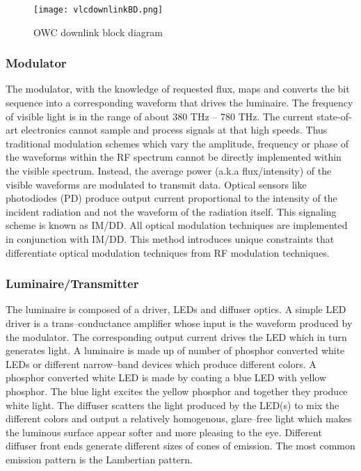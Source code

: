 \begin{figure}[!t]
	\centering
		\texttt{[image: vlcdownlinkBD.png]}
	\caption{OWC downlink block diagram}
	\label{fig:VLCdownBD}
\end{figure}

\subsubsection{Modulator}
\label{subsubsec:outlineModulator}
The modulator, with the knowledge of requested flux, maps and converts the bit sequence into a corresponding waveform that drives the luminaire. The frequency of visible light is in the range of about 380 THz -- 780 THz. The current state-of-art electronics cannot sample and process signals at that high speeds. Thus traditional modulation schemes which vary the amplitude, frequency or phase of the waveforms within the RF spectrum cannot be directly implemented within the visible spectrum. Instead, the average power (a.k.a flux/intensity) of the visible waveforms are modulated to transmit data. Optical sensors like photodiodes (PD) produce output current proportional to the intensity of the incident radiation and not the waveform of the radiation itself. This signaling scheme is known as IM/DD. All optical modulation techniques are implemented in conjunction with IM/DD. This method introduces unique constraints that differentiate optical modulation techniques from RF modulation techniques.

\subsubsection{Luminaire/Transmitter}
\label{subsubsec:outlineLuminaire}
The luminaire is composed of a driver, LEDs and diffuser optics. A simple LED driver is a trans--conductance amplifier whose input is the waveform produced by the modulator. The corresponding output current drives the LED which in turn generates light. A luminaire is made up of number of phosphor converted white LEDs or different narrow--band devices which produce different colors. A phosphor converted white LED is made by coating a blue LED with yellow phosphor. The blue light excites the yellow phosphor and together they produce white light. The diffuser scatters the light produced by the LED(s) to mix the different colors and output a relatively homogenous, glare--free light which makes the luminous surface appear softer and more pleasing to the eye. Different diffuser front ends generate different sizes of cones of emission. The most common emission pattern is the Lambertian pattern. 

